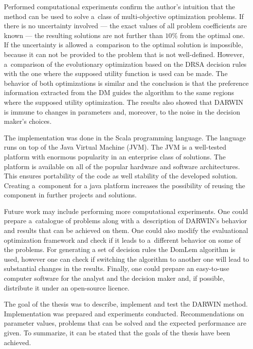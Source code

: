 Performed computational experiments confirm the author's intuition that the
method can be used to solve a~class of multi-objective optimization
problems. If there is no uncertainty involved --- the exact values of all
problem coefficients are known --- the resulting solutions are not further
than $10\%$ from the optimal one. If the uncertainty is allowed a~comparison
to the optimal solution is impossible, because it can not be provided to the
problem that is not well-defined. However, a~comparison of the evolutionary
optimization based on the DRSA decision rules with the one where the supposed
utility function is used can be made. The behavior of both optimizations is
similar and the conclusion is that the preference information extracted from
the DM guides the algorithm to the same regions where the supposed utility
optimization. The results also showed that DARWIN is immune to changes in
parameters and, moreover, to the noise in the decision maker's choices.

The implementation was done in the Scala programming language. The language
runs on top of the Java Virtual Machine (JVM). The JVM is a well-tested
platform with enormous popularity in an enterprise class of solutions. The
platform is available on all of the popular hardware and software
architectures. This ensures portability of the code as well stability of the
developed solution. Creating a~component for a java platform increases the
possibility of reusing the component in further projects and solutions.

Future work may include performing more computational experiments. One could
prepare a~catalogue of problems along with a~description of DARWIN's behavior
and results that can be achieved on them. One could also modify the
evaluational optimization framework and check if it leads to a~different
behavior on some of the problems. For generating a set of decision rules the
DomLem algorithm is used, however one can check if switching the algorithm to
another one will lead to substantial changes in the results. Finally, one
could prepare an easy-to-use computer software for the analyst and the
decision maker and, if possible, distribute it under an open-source licence.

The goal of the thesis was to describe, implement and test the DARWIN
method. Implementation was prepared and experiments conducted. Recommendations
on parameter values, problems that can be solved and the expected performance
are given. To summarize, it can be stated that the goals of the thesis have
been achieved.

